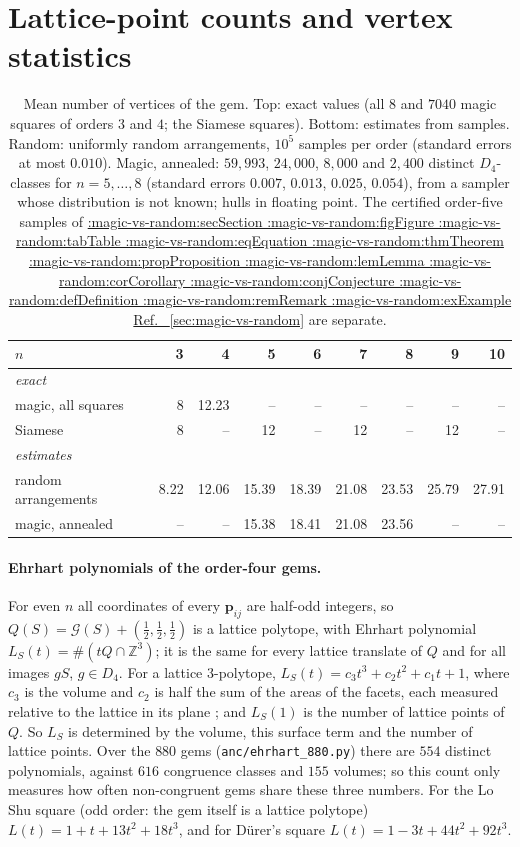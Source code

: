 \documentclass[11pt,a4paper]{article}
\makeatletter
\def\Cref@getprefix#1:#2\relax{#1}
\def\Cref@prefix@sec{sec}
\def\Cref@prefix@fig{fig}
\def\Cref@prefix@tab{tab}
\def\Cref@prefix@eq{eq}
\def\Cref@prefix@thm{thm}
\def\Cref@prefix@prop{prop}
\def\Cref@prefix@lem{lem}
\def\Cref@prefix@cor{cor}
\def\Cref@prefix@conj{conj}
\def\Cref@prefix@def{def}
\def\Cref@prefix@rem{rem}
\def\Cref@prefix@ex{ex}
\def\Cref@type@cap#1{%
  \edef\Cref@tmp{#1}%
  \ifx\Cref@tmp\Cref@prefix@sec Section%
  \else\ifx\Cref@tmp\Cref@prefix@fig Figure%
  \else\ifx\Cref@tmp\Cref@prefix@tab Table%
  \else\ifx\Cref@tmp\Cref@prefix@eq Equation%
  \else\ifx\Cref@tmp\Cref@prefix@thm Theorem%
  \else\ifx\Cref@tmp\Cref@prefix@prop Proposition%
  \else\ifx\Cref@tmp\Cref@prefix@lem Lemma%
  \else\ifx\Cref@tmp\Cref@prefix@cor Corollary%
  \else\ifx\Cref@tmp\Cref@prefix@conj Conjecture%
  \else\ifx\Cref@tmp\Cref@prefix@def Definition%
  \else\ifx\Cref@tmp\Cref@prefix@rem Remark%
  \else\ifx\Cref@tmp\Cref@prefix@ex Example%
  \else Ref.%
  \fi\fi\fi\fi\fi\fi\fi\fi\fi\fi\fi\fi
}
\DeclareRobustCommand{\Cref}[1]{%
  \begingroup
  \edef\Cref@label{#1}%
  \edef\Cref@prefix{\expandafter\Cref@getprefix\Cref@label:\relax}%
  \hyperref[#1]{\Cref@type@cap{\Cref@prefix}~\ref*{#1}}%
  \endgroup
}
\theoremstyle{plain}
\theoremstyle{definition}
\theoremstyle{remark}
\newcommand{\Z}{\mathbb{Z}}
\makeatother
\begin{document}
\section{Lattice-point counts and vertex statistics}
\label{sec:lattice-stats}

\begin{table}[htbp]
\centering
\caption{Mean number of vertices of the gem. Top: exact values (all $8$ and $7040$ magic squares of orders $3$ and $4$; the Siamese squares). Bottom: estimates from samples. Random: uniformly random arrangements, $10^5$ samples per order (standard errors at most $0.010$). Magic, annealed: $59{,}993$, $24{,}000$, $8{,}000$ and $2{,}400$ distinct $D_4$-classes for $n=5,\dots,8$ (standard errors $0.007$, $0.013$, $0.025$, $0.054$), from a sampler whose distribution is not known; hulls in floating point. The certified order-five samples of \Cref{sec:magic-vs-random} are separate.}
\label{tab:vertices}
\small
\begin{tabular}{l rrrrrrrr}
\toprule
$n$ & 3 & 4 & 5 & 6 & 7 & 8 & 9 & 10\\
\midrule
\multicolumn{9}{l}{\emph{exact}}\\
magic, all squares & 8 & 12.23 & -- & -- & -- & -- & -- & --\\
Siamese & 8 & -- & 12 & -- & 12 & -- & 12 & --\\
\midrule
\multicolumn{9}{l}{\emph{estimates}}\\
random arrangements & 8.22 & 12.06 & 15.39 & 18.39 & 21.08 & 23.53 & 25.79 & 27.91\\
magic, annealed & -- & -- & 15.38 & 18.41 & 21.08 & 23.56 & -- & --\\
\bottomrule
\end{tabular}
\end{table}

\paragraph{Ehrhart polynomials of the order-four gems.}
\label{sec:ehrhart}
For even $n$ all coordinates of every $\mathbf p_{ij}$ are half-odd integers, so $Q(S)=\mathcal G(S)+(\frac12,\frac12,\frac12)$ is a lattice polytope, with Ehrhart polynomial $L_S(t)=\#(tQ\cap\Z^3)$; it is the same for every lattice translate of $Q$ and for all images $gS$, $g\in D_4$.
For a lattice $3$-polytope, $L_S(t)=c_3t^3+c_2t^2+c_1t+1$, where $c_3$ is the volume and $c_2$ is half the sum of the areas of the facets, each measured relative to the lattice in its plane \cite[Ch.~3 and~5]{beck2015computing}; and $L_S(1)$ is the number of lattice points of $Q$.
So $L_S$ is determined by the volume, this surface term and the number of lattice points.
Over the $880$ gems (\texttt{anc/ehrhart\_880.py}) there are $554$ distinct polynomials, against $616$ congruence classes and $155$ volumes; so this count only measures how often non-congruent gems share these three numbers.
For the Lo Shu square (odd order: the gem itself is a lattice polytope) $L(t)=1+t+13t^2+18t^3$, and for D\"urer's square $L(t)=1-3t+44t^2+92t^3$.
\end{document}
